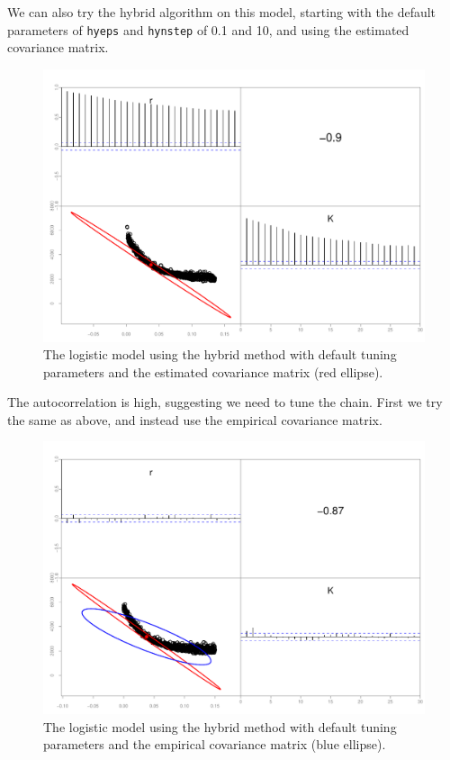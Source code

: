 \documentclass{article}\usepackage[]{graphicx}\usepackage[]{color}
\begin{document}
We can also try the hybrid algorithm on this model, starting
with the default parameters of \texttt{hyeps} and
\texttt{hynstep} of 0.1 and 10, and using the estimated
covariance matrix.
\begin{figure}[H]
  \centering
  \includegraphics[width=5in]{../plots/logistic_hy.pdf}
  \caption{The logistic model using the hybrid method with
    default tuning parameters and the estimated covariance matrix
    (red ellipse).}
  \label{fig:logistic_hy}
\end{figure}
The autocorrelation is high, suggesting we need to tune the
chain. First we try the same as above, and instead use the
empirical covariance matrix.
\begin{figure}[H]
  \centering
  \includegraphics[width=5in]{../plots/logistic_hy2.pdf}
  \caption{The logistic model using the hybrid method with
    default tuning parameters and the empirical covariance matrix
    (blue ellipse).}
  \label{fig:logistic_hy2}
\end{figure}
\end{document}
